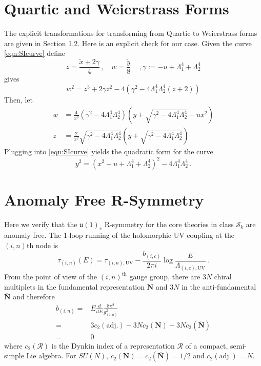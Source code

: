 \documentclass[main.tex]{subfiles}
\begin{document}
\section{Quartic and Weierstrass Forms}\label{App:quartquad}
The explicit transformations for transforming from Quartic to Weierstrass forms are given in \cite{connell1996elliptic} Section 1.2.
Here is an explicit check for our case. Given the curve \eqref{eqn:SIcurve}  define
\begin{equation}
z=\frac{\tilde{x}+2\gamma}{4}\,,\quad
w=\frac{\tilde{y}}{8}\quad\,,
\gamma:=-u+\Lambda^4_1+\Lambda^4_2
\end{equation}
gives
\begin{equation}
w^2=z^3+2\gamma z^2-4(\gamma^2-4\Lambda^4_1\Lambda^4_2(z+2))
\end{equation}
Then, let
\begin{align}
w&=\frac{4}{x^3}(\gamma^2-4\Lambda^4_1\Lambda^4_2)(y+\sqrt{\gamma^2-4\Lambda^4_1\Lambda^4_2}-ux^2)\\
z&=\frac{2}{x^2}\sqrt{\gamma^2-4\Lambda^4_1\Lambda^4_2}(y+\sqrt{\gamma^2-4\Lambda^4_1\Lambda^4_2})
\end{align}
Plugging into \eqref{eqn:SIcurve} yields the quadratic form for the curve \cite{Csaki:1997zg}
\begin{equation}
y^2=(x^2-u+\Lambda^4_1+\Lambda^4_2)^2-4\Lambda^4_1\Lambda^4_2\,.
\end{equation}
\section{Anomaly Free R-Symmetry}
Here we verify that the $\mathfrak{u}(1)_r$ R-symmetry for the core theories in class $\mathcal{S}_k$ are anomaly free.
The 1-loop running of the holomorphic UV coupling at the $(i,n){\text{th}}$ node is
\begin{equation}\label{eqn:betafn}
\tau_{(i,n)}(E) = \tau_{(i,n),\text{UV}} - \frac{b_{(i,c)}}{2\pi i}\log\frac{E}{\Lambda_{(i,c),\text{UV}}} \,.
\end{equation}
From the point of view of the $(i,n)^{\text{th}}$ gauge group, there are $3N$ chiral multiplets in the fundamental representation $\mathbf{N}$ and $3N$ in the anti-fundamental $\overline{\mathbf{N}}$ and therefore
\begin{align}
b_{(i,n)}=&E\frac{d}{dE}\frac{8\pi^2}{g_{(i,n)}^2}\\
=&3c_2(\text{adj.})-3Nc_2(\mathbf{N})-3Nc_2(\overline{\mathbf{N}})\\
=&0
\end{align}
where $c_2(\mathcal{R})$ is the Dynkin index of a representation $\mathcal{R}$ of a compact, semi-simple Lie algebra. For $SU(N)$, $c_2(\mathbf{N})=c_2(\overline{\mathbf{N}})=1/2$ and $c_2(\text{adj.})=N$.
\end{document}
